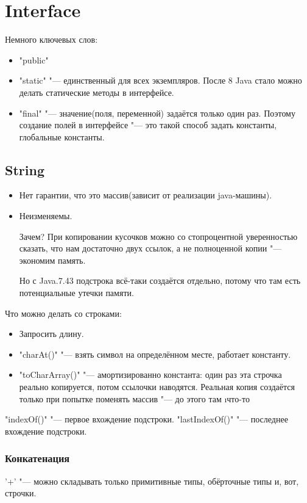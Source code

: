 \chapter{Interface}
Немного ключевых слов:
\begin{itemize}
	\item
		\java"public"
	\item
		\java"static" "--- единственный для всех экземпляров.
			После 8 Java стало можно делать статические методы в интерфейсе.
\item
		\java"final" "--- значение(поля, переменной) задаётся только один раз.
			Поэтому создание полей в интерфейсе "--- 
			это такой способ задать константы, глобальные константы.
		\end{itemize}


\section{String}
\begin{itemize}
	\item
		Нет гарантии, что это массив(зависит от реализации java-машины).
	\item
		Неизменяемы.
		
		Зачем? При копировании кусочков можно со стопроцентной уверенностью сказать, что нам достаточно двух ссылок, а не 
		полноценной копии "--- экономим память.

		Но с Java.7.43 подстрока всё-таки создаётся отдельно, потому что там есть потенциальные утечки памяти.		
\end{itemize}

Что можно делать со строками:
\begin{itemize}
	\item
		Запросить длину.
	\item
		\java"charAt()" "--- взять символ на определённом месте, работает константу.
	\item
		\java"toCharArray()" "--- амортизированно константа: один раз эта строчка реально копируется, потом ссылочки наводятся.
		Реальная копия создаётся только при попытке поменять массив "--- до этого там \i{что-то}
\end{itemize}

\java"indexOf()" "--- первое вхождение подстроки.
\java"lastIndexOf()" "--- последнее вхождение подстроки.

\subsection{Конкатенация}
'+' "--- можно складывать только примитивные типы, обёрточные типы и, вот, строчки.

